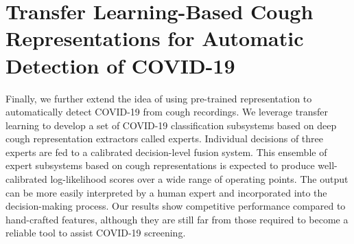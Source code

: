 \section{Transfer Learning-Based Cough Representations for Automatic Detection of COVID-19}
Finally, we further extend the idea of using pre-trained representation to automatically detect COVID-19 from cough recordings. We leverage transfer learning to develop a set of COVID-19 classification subsystems based on deep cough representation extractors called experts. Individual decisions of three experts are fed to a calibrated decision-level fusion system. This ensemble of expert subsystems based on cough representations is expected to produce well-calibrated log-likelihood scores over a wide range of operating points. The output can be more easily interpreted by a human expert and incorporated into the decision-making process. Our results show competitive performance compared to hand-crafted features, although they are still far from those required to become a reliable tool to assist COVID-19 screening.
